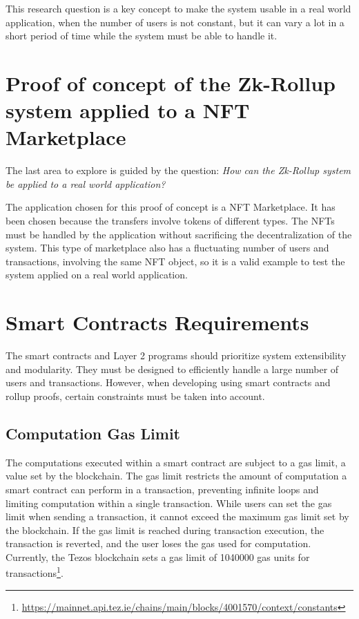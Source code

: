 This research question is a key concept to make the system usable in a real world application, when the number of users is not constant, but it can vary a lot in a short period of time while the system must be able to handle it.

\section{Proof of concept of the Zk-Rollup system applied to a NFT Marketplace}
The last area to explore is guided by the question: \textit{How can the Zk-Rollup system be applied to a real world application?}

The application chosen for this proof of concept is a NFT Marketplace. It has been chosen because the transfers involve tokens of different types. The NFTs must be handled by the application without sacrificing the decentralization of the system. This type of marketplace also has a fluctuating number of users and transactions, involving the same NFT object, so it is a valid example to test the system applied on a real world application.

\section{Smart Contracts Requirements \label{sec:3_smartContractsRequirements}}

The smart contracts and Layer 2 programs should prioritize system extensibility and modularity. They must be designed to efficiently handle a large number of users and transactions. However, when developing using smart contracts and rollup proofs, certain constraints must be taken into account.

\subsection{Computation Gas Limit \label{subsec:gasLimit}}

The computations executed within a smart contract are subject to a gas limit, a value set by the blockchain. The gas limit restricts the amount of computation a smart contract can perform in a transaction, preventing infinite loops and limiting computation within a single transaction. While users can set the gas limit when sending a transaction, it cannot exceed the maximum gas limit set by the blockchain. If the gas limit is reached during transaction execution, the transaction is reverted, and the user loses the gas used for computation. Currently, the Tezos blockchain sets a gas limit of 1040000 gas units for transactions\footnote{\url{https://mainnet.api.tez.ie/chains/main/blocks/4001570/context/constants}}.

